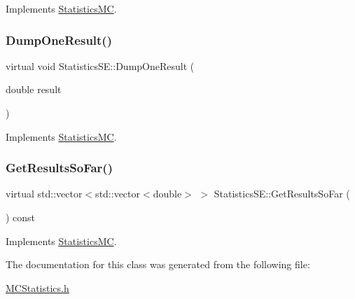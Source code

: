 Implements \hyperlink{classStatisticsMC_af716d17e088d36f283e112ba736f8002}{Statistics\+MC}.

\hypertarget{classStatisticsSE_a3628cdafd9ed239168b4fc50db7f1e1e}{}\label{classStatisticsSE_a3628cdafd9ed239168b4fc50db7f1e1e} 
\subsubsection{\texorpdfstring{Dump\+One\+Result()}{DumpOneResult()}}
{\footnotesize\ttfamily virtual void Statistics\+S\+E\+::\+Dump\+One\+Result (\begin{DoxyParamCaption}\item[{double}]{result }\end{DoxyParamCaption})\hspace{0.3cm}{\ttfamily [virtual]}}



Implements \hyperlink{classStatisticsMC_a3ab5fb27d6933d8e35b2a55c3897cbe3}{Statistics\+MC}.

\hypertarget{classStatisticsSE_a4ae9b974c43eccf3e60b307eb26689a4}{}\label{classStatisticsSE_a4ae9b974c43eccf3e60b307eb26689a4} 
\subsubsection{\texorpdfstring{Get\+Results\+So\+Far()}{GetResultsSoFar()}}
{\footnotesize\ttfamily virtual std\+::vector$<$std\+::vector$<$double$>$ $>$ Statistics\+S\+E\+::\+Get\+Results\+So\+Far (\begin{DoxyParamCaption}{ }\end{DoxyParamCaption}) const\hspace{0.3cm}{\ttfamily [virtual]}}



Implements \hyperlink{classStatisticsMC_ae29a294b6db36c2bf46c20ac30e25aad}{Statistics\+MC}.



The documentation for this class was generated from the following file\+:\begin{DoxyCompactItemize}
\item 
\hyperlink{MCStatistics_8h}{M\+C\+Statistics.\+h}\end{DoxyCompactItemize}
